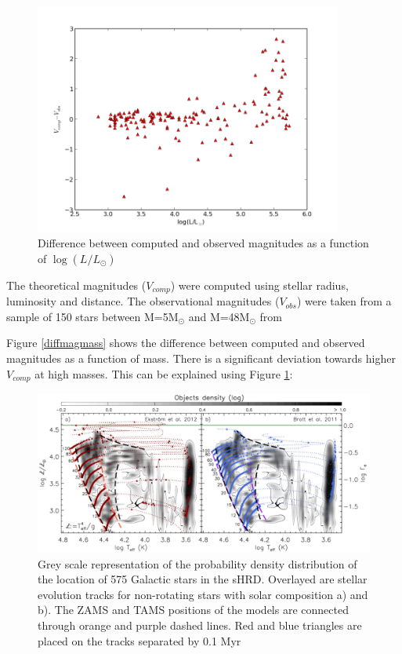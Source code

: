  \begin{figure}[h!]
  \includegraphics[width=0.9\textwidth]{diffmaglogL}
  \caption{Difference between computed and observed magnitudes as a function of $\log(L/L_\odot)$}
 \end{figure}
 
 The theoretical magnitudes ($V_{comp}$) were computed using stellar radius, luminosity and distance. The observational magnitudes ($V_{obs}$)
 were taken from a sample of 150 stars between M=5M$_\odot$ and M=48M$_\odot$ from \citep{2014A&A...570L..13C}
 
 Figure \ref{diffmagmass} shows the difference between computed and observed magnitudes as a function of mass. There is a significant
 deviation towards higher $V_{comp}$ at high masses. This can be explained using Figure \ref{castroetal}:
 \begin{figure}
  \includegraphics[width=\textwidth]{Castroetal}
  \caption{Grey scale representation of the probability density distribution of the location of 575 Galactic stars in the sHRD.
  Overlayed are stellar evolution tracks for non-rotating stars with solar composition a)\citet{2012A&A...537A.146E}
  and b)\citet{2011yCat..35309115B}. The ZAMS and TAMS positions of the models are connected through orange and purple dashed lines.
  Red and blue triangles are placed on the tracks separated by 0.1 Myr \citep{2014A&A...570L..13C}\label{castroetal}}
 \end{figure}

